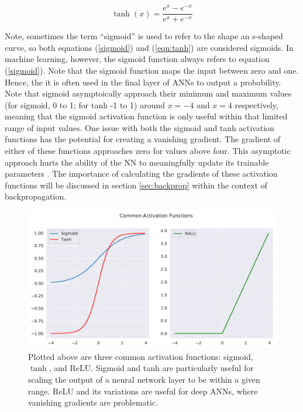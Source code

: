 \begin{equation}
    \label{eqn:tanh}
    \tanh(x) = \frac{e^x - e^{-x}}{e^x + e^{-x}} 
\end{equation}

\noindent Note, sometimes the term ``sigmoid'' is used to refer to the shape an s-shaped curve, so both equations (\ref{sigmoid}) and (\ref{eqn:tanh}) are considered sigmoids. In machine learning, however, the sigmoid function always refers to equation (\ref{sigmoid}). Note that the sigmoid function maps the input between zero and one. Hence, the it is often used in the final layer of ANNs to output a probability. Note that sigmoid asymptoically approach their minimum and maximum values (for sigmoid, 0 to 1; for tanh -1 to 1) around $ {x=-4} $ and $ {x=4} $ respectively, meaning that the sigmoid activation function is only useful within that limited range of input values. One issue with both the sigmoid and tanh activation functions has the potential for creating a vanishing gradient. The gradient of either of these functions approaches zero for values above four. This asymptotic approach hurts the ability of the NN to meaningfully update its trainable parameters  \cite{nn-regularization}. The importance of calculating the gradients of these activation functions will be discussed in section \ref{sec:backprop} within the context of backpropagation. 

\begin{figure}[h!]
    \centering
    \includegraphics[width=\linewidth]{Chapters/Figures/sigmoids2.pdf}
    \caption[Common Activation Functions]{Plotted above are three common activation functions: sigmoid, $\tanh$, and ReLU. Sigmoid and tanh are particularly useful for scaling the output of a neural network layer to be within a given range. ReLU and its variations are useful for deep ANNs, where vanishing gradients are problematic.}
    \label{fig:ActivationFunctions}
\end{figure}

